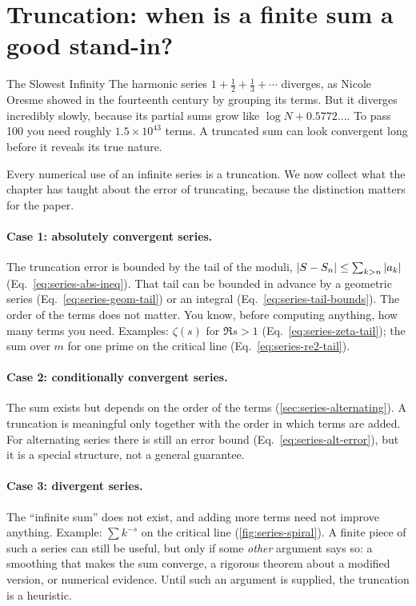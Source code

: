 \section{Truncation: when is a finite sum a good stand-in?}\label{sec:series-truncation}
\begin{didyouknow}{The Slowest Infinity}
The harmonic series $1+\tfrac12+\tfrac13+\cdots$ diverges, as Nicole Oresme showed in the fourteenth century by grouping its terms. But it diverges incredibly slowly, because its partial sums grow like $\log N+0.5772\ldots$. To pass 100 you need roughly $1.5\times10^{43}$ terms. A truncated sum can look convergent long before it reveals its true nature.
\end{didyouknow}

Every numerical use of an infinite series is a truncation. We now collect what the chapter has taught about the error of truncating, because the distinction matters for the paper.

\paragraph{Case 1: absolutely convergent series.} The truncation error is bounded by the tail of the moduli, $\left\lvert S-S_n\right\rvert\le\sum_{k>n}\left\lvert a_k\right\rvert$ (Eq.~\eqref{eq:series-abs-ineq}). That tail can be bounded in advance by a geometric series (Eq.~\eqref{eq:series-geom-tail}) or an integral (Eq.~\eqref{eq:series-tail-bounds}). The order of the terms does not matter. You know, before computing anything, how many terms you need. Examples: $\zeta(s)$ for $\Re s>1$ (Eq.~\eqref{eq:series-zeta-tail}); the sum over $m$ for one prime on the critical line (Eq.~\eqref{eq:series-re2-tail}).

\paragraph{Case 2: conditionally convergent series.} The sum exists but depends on the order of the terms (\cref{sec:series-alternating}). A truncation is meaningful only together with the order in which terms are added. For alternating series there is still an error bound (Eq.~\eqref{eq:series-alt-error}), but it is a special structure, not a general guarantee.

\paragraph{Case 3: divergent series.} The ``infinite sum'' does not exist, and adding more terms need not improve anything. Example: $\sum k^{-s}$ on the critical line (\cref{fig:series-spiral}). A finite piece of such a series can still be useful, but only if some \emph{other} argument says so: a smoothing that makes the sum converge, a rigorous theorem about a modified version, or numerical evidence. Until such an argument is supplied, the truncation is a heuristic.

